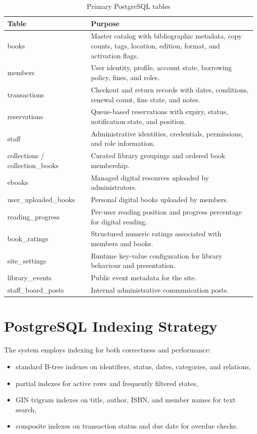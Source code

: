 \documentclass[12pt,a4paper]{report}
\begin{document}
\begin{table}[h!]
\centering
\begin{tabularx}{\textwidth}{p{} X}
\toprule
\textbf{Table} & \textbf{Purpose} \\
\midrule
books & Master catalog with bibliographic metadata, copy counts, tags, location, edition, format, and activation flags. \\
members & User identity, profile, account state, borrowing policy, fines, and roles. \\
transactions & Checkout and return records with dates, conditions, renewal count, fine state, and notes. \\
reservations & Queue-based reservations with expiry, status, notification state, and position. \\
staff & Administrative identities, credentials, permissions, and role information. \\
collections / collection\_books & Curated library groupings and ordered book membership. \\
ebooks & Managed digital resources uploaded by administrators. \\
user\_uploaded\_books & Personal digital books uploaded by members. \\
reading\_progress & Per-user reading position and progress percentage for digital reading. \\
book\_ratings & Structured numeric ratings associated with members and books. \\
site\_settings & Runtime key-value configuration for library behaviour and presentation. \\
library\_events & Public event metadata for the site. \\
staff\_board\_posts & Internal administrative communication posts. \\
\bottomrule
\end{tabularx}
\caption{Primary PostgreSQL tables}
\end{table}

\section{PostgreSQL Indexing Strategy}
The system employs indexing for both correctness and performance:
\begin{itemize}[leftmargin=1.5em]
    \item standard B-tree indexes on identifiers, status, dates, categories, and relations,
    \item partial indexes for active rows and frequently filtered states,
    \item GIN trigram indexes on title, author, ISBN, and member names for text search,
    \item composite indexes on transaction status and due date for overdue checks.
\end{itemize}
\end{document}
